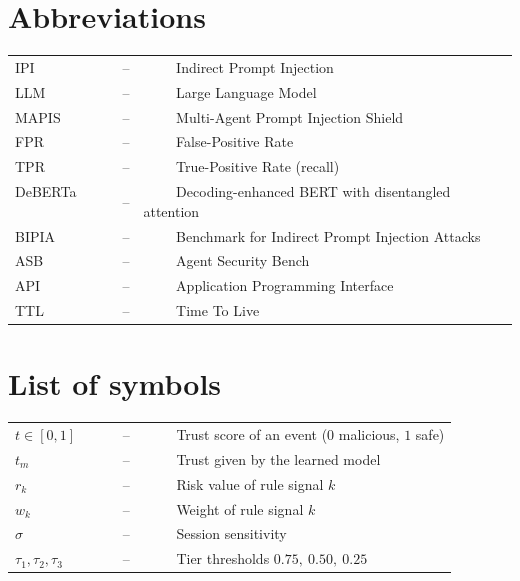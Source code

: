 \section*{{\huge Abbreviations}\hfill} 
\vspace{0.6cm}
\begin{tabular}{lll}
IPI ~~~~&--&~~~~ Indirect Prompt Injection\\
LLM ~~~~&--&~~~~ Large Language Model\\
MAPIS ~~~~&--&~~~~ Multi-Agent Prompt Injection Shield\\
FPR ~~~~&--&~~~~ False-Positive Rate\\
TPR ~~~~&--&~~~~ True-Positive Rate (recall)\\
DeBERTa ~~~~&--&~~~~ Decoding-enhanced BERT with disentangled attention\\
BIPIA ~~~~&--&~~~~ Benchmark for Indirect Prompt Injection Attacks\\
ASB ~~~~&--&~~~~ Agent Security Bench\\
API ~~~~&--&~~~~ Application Programming Interface\\
TTL ~~~~&--&~~~~ Time To Live\\
\end{tabular}
\newpage
\section*{{\huge List of symbols}\hfill} 
\vspace{0.6cm}
\begin{tabular}{lll}
$t \in [0,1]$ ~~~~&--&~~~~ Trust score of an event ($0$ malicious, $1$ safe)\\
$t_m$ ~~~~&--&~~~~ Trust given by the learned model\\
$r_k$ ~~~~&--&~~~~ Risk value of rule signal $k$\\
$w_k$ ~~~~&--&~~~~ Weight of rule signal $k$\\
$\sigma$ ~~~~&--&~~~~ Session sensitivity\\
$\tau_1,\tau_2,\tau_3$ ~~~~&--&~~~~ Tier thresholds $0.75,\ 0.50,\ 0.25$\\
\end{tabular}

